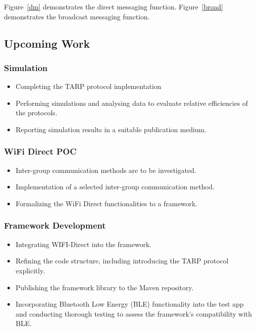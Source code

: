 Figure~\ref{dm} demonstrates the direct messaging function.
Figure~\ref{broad} demonstrates the broadcast messaging function.

\newpage

\subsection{Upcoming Work}

\subsubsection{Simulation}
\begin{itemize}
    \item Completing the TARP protocol implementation
    \item Performing simulations and analysing data to evaluate relative
          efficiencies of the protocols.
    \item Reporting simulation results in a suitable publication medium.
\end{itemize}

\vspace{0.3cm}

\subsubsection{WiFi Direct POC}
\begin{itemize}
    \item Inter-group communication methods are to be investigated.
    \item Implementation of a selected inter-group communication method.
    \item Formalizing the WiFi Direct functionalities to a framework.
\end{itemize}

\vspace{0.3cm}

\subsubsection{Framework Development}
\begin{itemize}
    \item Integrating WIFI-Direct into the framework.
    \item Refining the code structure, including introducing the TARP protocol
          explicitly.
    \item Publishing the framework library to the Maven repository.
    \item Incorporating Bluetooth Low Energy (BLE) functionality into the test
          app and conducting thorough testing to assess the framework's compatibility
          with BLE.
\end{itemize}

